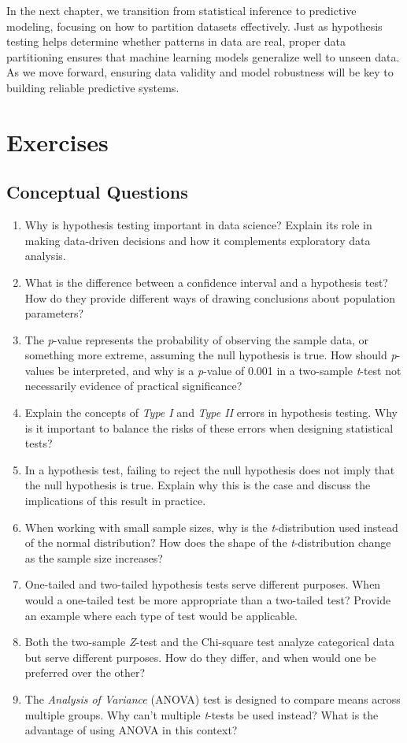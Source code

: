 \documentclass[
  11pt,
]{book}
\theoremstyle{definition}
\theoremstyle{definition}
\theoremstyle{definition}
\theoremstyle{definition}
\theoremstyle{remark}
\begin{document}
In the next chapter, we transition from statistical inference to predictive modeling, focusing on how to partition datasets effectively. Just as hypothesis testing helps determine whether patterns in data are real, proper data partitioning ensures that machine learning models generalize well to unseen data. As we move forward, ensuring data validity and model robustness will be key to building reliable predictive systems.

\section{Exercises}\label{exercises-3}

\subsection*{Conceptual Questions}\label{conceptual-questions-1}


\begin{enumerate}
\def\labelenumi{\arabic{enumi}.}
\item
  Why is hypothesis testing important in data science? Explain its role in making data-driven decisions and how it complements exploratory data analysis.
\item
  What is the difference between a confidence interval and a hypothesis test? How do they provide different ways of drawing conclusions about population parameters?
\item
  The \emph{p}-value represents the probability of observing the sample data, or something more extreme, assuming the null hypothesis is true. How should \emph{p}-values be interpreted, and why is a \emph{p}-value of 0.001 in a two-sample \emph{t}-test not necessarily evidence of practical significance?
\item
  Explain the concepts of \emph{Type I} and \emph{Type II} errors in hypothesis testing. Why is it important to balance the risks of these errors when designing statistical tests?
\item
  In a hypothesis test, failing to reject the null hypothesis does not imply that the null hypothesis is true. Explain why this is the case and discuss the implications of this result in practice.
\item
  When working with small sample sizes, why is the \emph{t}-distribution used instead of the normal distribution? How does the shape of the \emph{t}-distribution change as the sample size increases?
\item
  One-tailed and two-tailed hypothesis tests serve different purposes. When would a one-tailed test be more appropriate than a two-tailed test? Provide an example where each type of test would be applicable.
\item
  Both the two-sample \emph{Z}-test and the Chi-square test analyze categorical data but serve different purposes. How do they differ, and when would one be preferred over the other?
\item
  The \emph{Analysis of Variance} (ANOVA) test is designed to compare means across multiple groups. Why can't multiple \emph{t}-tests be used instead? What is the advantage of using ANOVA in this context?
\end{enumerate}
\end{document}
